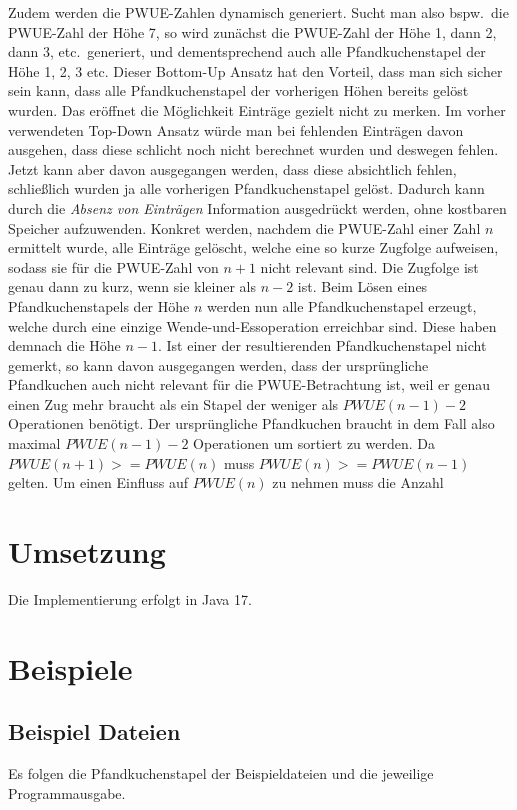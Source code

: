Zudem werden die PWUE-Zahlen dynamisch generiert.
Sucht man also bspw.\ die PWUE-Zahl der Höhe 7, so wird zunächst die PWUE-Zahl der Höhe 1, dann 2, dann 3, etc.\ generiert,
und dementsprechend auch alle Pfandkuchenstapel der Höhe 1, 2, 3 etc.
Dieser Bottom-Up Ansatz hat den Vorteil, dass man sich sicher sein kann, dass alle Pfandkuchenstapel der vorherigen
Höhen bereits gelöst wurden.
Das eröffnet die Möglichkeit Einträge gezielt nicht zu merken.
Im vorher verwendeten Top-Down Ansatz würde man bei fehlenden Einträgen davon ausgehen, dass diese schlicht noch nicht
berechnet wurden und deswegen fehlen.
Jetzt kann aber davon ausgegangen werden, dass diese absichtlich fehlen,
schlie{\ss}lich wurden ja alle vorherigen Pfandkuchenstapel gelöst.
Dadurch kann durch die \textit{Absenz von Einträgen} Information ausgedrückt werden, ohne kostbaren Speicher aufzuwenden.
Konkret werden, nachdem die PWUE-Zahl einer Zahl $n$ ermittelt wurde, alle Einträge gelöscht, welche eine so kurze Zugfolge
aufweisen, sodass sie für die PWUE-Zahl von $n + 1$ nicht relevant sind.
Die Zugfolge ist genau dann zu kurz, wenn sie kleiner als $n - 2$ ist.
Beim Lösen eines Pfandkuchenstapels der Höhe $n$ werden nun alle Pfandkuchenstapel erzeugt,
welche durch eine einzige Wende-und-Essoperation erreichbar sind.
Diese haben demnach die Höhe $n - 1$.
Ist einer der resultierenden Pfandkuchenstapel nicht gemerkt, so kann davon ausgegangen werden, dass der ursprüngliche
Pfandkuchen auch nicht relevant für die PWUE-Betrachtung ist, weil er genau einen Zug
mehr braucht als ein Stapel der weniger als $PWUE(n - 1) - 2$ Operationen benötigt.
Der ursprüngliche Pfandkuchen braucht in dem Fall also maximal $PWUE(n - 1) - 2$ Operationen um sortiert zu werden.
Da $PWUE(n + 1) >= PWUE(n)$ muss $PWUE(n) >= PWUE(n - 1)$ gelten.
Um einen Einfluss auf $PWUE(n)$ zu nehmen muss die Anzahl


\section{Umsetzung}\label{sec:umsetzung}
Die Implementierung erfolgt in Java 17.


\section{Beispiele}\label{sec:beispiele}

\subsection{Beispiel Dateien}\label{subsec:beispiel-dateien}
Es folgen die Pfandkuchenstapel der Beispieldateien und die jeweilige Programmausgabe.
